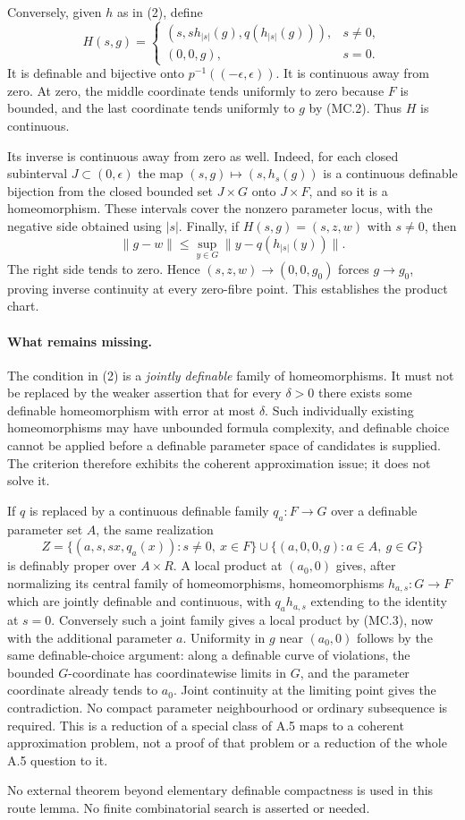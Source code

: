 Conversely, given $h$ as in (2), define
\[
 H(s,g)=
 \begin{cases}
   (s,s h_{|s|}(g),q(h_{|s|}(g))),&s\ne0,\\
   (0,0,g),&s=0.
 \end{cases}
 \tag{MC.3}
\]
It is definable and bijective onto $p^{-1}((-
\epsilon,\epsilon))$. It is continuous away from zero. At zero,
the middle coordinate tends uniformly to zero because $F$ is bounded,
and the last coordinate tends uniformly to $g$ by (MC.2). Thus $H$
is continuous.

Its inverse is continuous away from zero as well. Indeed, for each
closed subinterval $J\subset(0,\epsilon)$ the map
$(s,g)\mapsto(s,h_s(g))$ is a continuous definable bijection from
the closed bounded set $J\times G$ onto $J\times F$, and so it is
a homeomorphism. These intervals cover the nonzero parameter locus,
with the negative side obtained using $|s|$. Finally, if
$H(s,g)=(s,z,w)$ with $s\ne0$, then
\[
 \lVert g-w\rVert
       \le\sup_{y\in G}\lVert y-q(h_{|s|}(y))\rVert.
\]
The right side tends to zero. Hence $(s,z,w)\to(0,0,g_0)$ forces
$g\to g_0$, proving inverse continuity at every zero-fibre point.
This establishes the product chart.

\paragraph{What remains missing.}
The condition in (2) is a \emph{jointly definable} family of
homeomorphisms. It must not be replaced by the weaker assertion that
for every $\delta>0$ there exists some definable homeomorphism with
error at most $\delta$. Such individually existing homeomorphisms may
have unbounded formula complexity, and definable choice cannot be
applied before a definable parameter space of candidates is supplied.
The criterion therefore exhibits the coherent approximation issue; it
does not solve it.

If $q$ is replaced by a continuous definable family
$q_a:F\to G$ over a definable parameter set $A$, the same realization
\[
 Z=\{(a,s,sx,q_a(x)):s\ne0,\ x\in F\}
       \cup\{(a,0,0,g):a\in A,\ g\in G\}
 \tag{MC.4}
\]
is definably proper over $A\times R$. A local product at $(a_0,0)$
gives, after normalizing its central family of homeomorphisms,
homeomorphisms $h_{a,s}:G\to F$ which are jointly definable and
continuous, with $q_a h_{a,s}$ extending to the identity at $s=0$.
Conversely such a joint family gives a local product by (MC.3), now
with the additional parameter $a$. Uniformity in $g$ near $(a_0,0)$
follows by the same definable-choice argument: along a definable curve
of violations, the bounded $G$-coordinate has coordinatewise limits
in $G$, and the parameter coordinate already tends to $a_0$. Joint
continuity at the limiting point gives the contradiction. No compact
parameter neighbourhood or ordinary subsequence is required.
This is a reduction of a special class of A.5 maps to a coherent
approximation problem, not a proof of that problem or a reduction of
the whole A.5 question to it.

No external theorem beyond elementary definable compactness is used in
this route lemma. No finite combinatorial search is asserted or needed.

